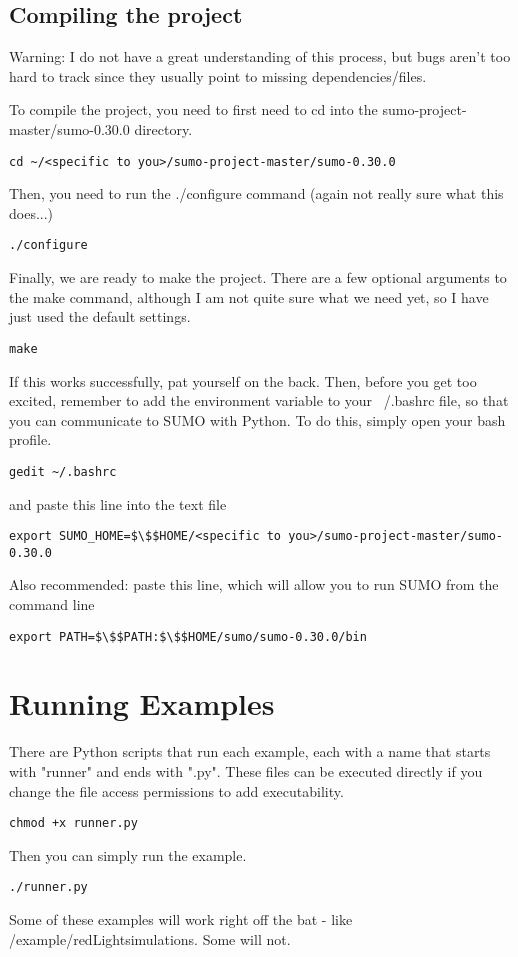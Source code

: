 \documentclass{article}
\begin{document}
\subsection{Compiling the project}
Warning: I do not have a great understanding of this process, but bugs aren't too hard to track since they usually point to missing dependencies/files. 

To compile the project, you need to first need to cd into the sumo-project-master/sumo-0.30.0 directory.
\begin{lstlisting}
cd ~/<specific to you>/sumo-project-master/sumo-0.30.0
\end{lstlisting}
Then, you need to run the ./configure command (again not really sure what this does...)
\begin{lstlisting}
./configure
\end{lstlisting}
Finally, we are ready to make the project. There are a few optional arguments to the make command, although I am not quite sure what we need yet, so I have just used the default settings.
\begin{lstlisting}
make
\end{lstlisting}

If this works successfully, pat yourself on the back. Then, before you get too excited, remember to add the environment variable to your ~/.bashrc file, so that you can communicate to SUMO with Python. To do this, simply open your bash profile. 
\begin{lstlisting}
gedit ~/.bashrc
\end{lstlisting}
and paste this line into the text file
\begin{lstlisting}
export SUMO_HOME=$\$$HOME/<specific to you>/sumo-project-master/sumo-0.30.0
\end{lstlisting}
Also recommended: paste this line, which will allow you to run SUMO from the command line
\begin{lstlisting}
export PATH=$\$$PATH:$\$$HOME/sumo/sumo-0.30.0/bin
\end{lstlisting}

\section{Running Examples}
There are Python scripts that run each example, each with a name that starts with "runner" and ends with ".py". These files can be executed directly if you change the file access permissions to add executability.
\begin{lstlisting}
chmod +x runner.py
\end{lstlisting}
Then you can simply run the example. 
\begin{lstlisting}
./runner.py
\end{lstlisting}
Some of these examples will work right off the bat - like /example/redLight\textunderscore simulations. Some will not. 
\end{document}
